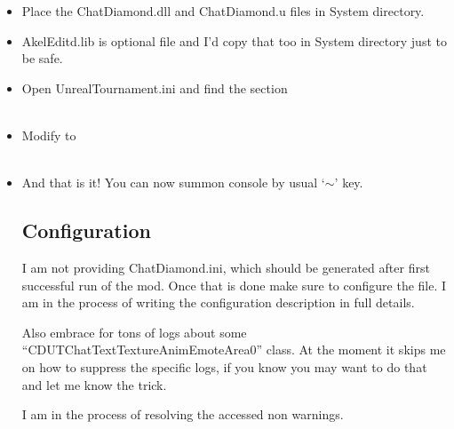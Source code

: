 \documentclass{article}
\theoremstyle{definition}
\newcommand{\FileColor}[1]{{\color{Purple} #1}}
\newcommand{\FolderColor}[1]{{\color{mygray} #1}}
\begin{document}
\begin{itemize}
\item Place the \FileColor{ChatDiamond.dll} and \FileColor{ChatDiamond.u} files in \FolderColor{System} directory.
\item \FileColor{AkelEditd.lib} is optional file and I'd copy that too in \FolderColor{System} directory just to be safe.
\item Open \FileColor{UnrealTournament.ini} and find the section \\

\\

\item Modify to \\

\\

\item And that is it!  You can now summon console by usual `$\sim$' key.

\subsection{Configuration}
I am not providing {\color{purple}ChatDiamond.ini}, which should be generated after first successful run of the mod.  
Once that is done make sure to configure the file.  I am in the process of writing the configuration description in full details.

Also embrace for tons of logs about some  ``CDUTChatTextTextureAnimEmoteArea0'' class.  At the moment it skips me on how to suppress the specific logs, if you know you may want to do that and let me know the trick.

I am in the process of resolving the accessed non warnings.

\end{itemize}
\end{document}
